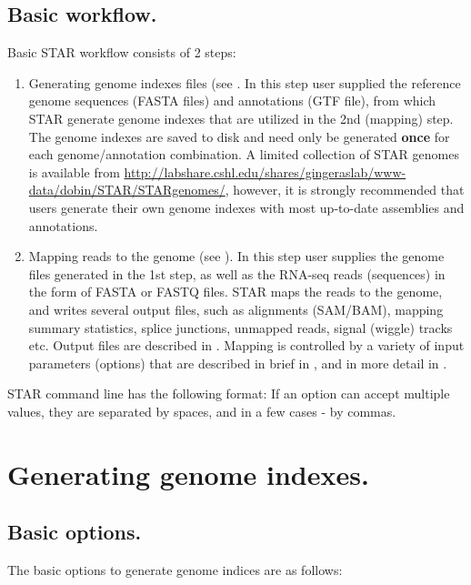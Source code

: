 \documentclass[12pt]{article}
\begin{document}
\subsection{Basic workflow.}
Basic STAR workflow consists of 2 steps:
\begin{enumerate}
\item
Generating genome indexes files (see .\newline
In this step user supplied the reference genome sequences (FASTA files) and annotations (GTF file), from which STAR generate genome indexes that are utilized in the 2nd (mapping) step. The genome indexes are saved to disk and need only be generated \textbf{once} for each genome/annotation combination. A limited collection of STAR genomes is available from \url{http://labshare.cshl.edu/shares/gingeraslab/www-data/dobin/STAR/STARgenomes/}, however, it is strongly recommended that users generate their own genome indexes with most up-to-date assemblies and annotations.
\item
Mapping reads to the genome (see ).\newline
In this step user supplies the genome files generated in the 1st step, as well as the RNA-seq reads (sequences) in the form of FASTA or FASTQ files. STAR maps the reads to the genome, and writes several output files, such as alignments (SAM/BAM), mapping summary statistics, splice junctions, unmapped reads, signal (wiggle) tracks etc. Output files are described in . Mapping is controlled by a variety of input parameters (options) that are described in brief in , and in more detail in .
\end{enumerate}

STAR command line has the following format:
If an option can accept multiple values, they are separated by spaces, and in a few cases - by commas.


\section{Generating genome indexes.}\label{Generating_genome_indexes}
\subsection{Basic options.}
The basic options to generate genome indices are as follows:
\end{document}
